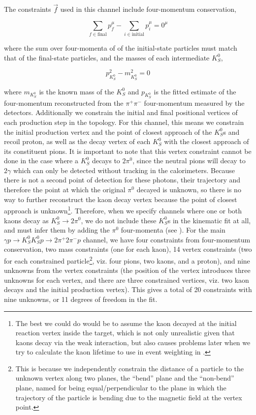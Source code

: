 The constraints $\vec{f}$ used in this channel include four-momentum conservation,

\begin{equation}
  \sum_{f\in\text{final}} p^\mu_{f} - \sum_{i\in\text{initial}} p^\mu_{i} = 0^\mu
  \label{eq:four-momentum-constraint}
\end{equation}

where the sum over four-momenta of of the initial-state particles must match that of the final-state particles, and the masses of each intermediate $K_S^0$,

\begin{equation}
  p_{K_S^0}^2 - m_{K_S^0}^2 = 0
\end{equation}

where $m_{K_S^0}$ is the known mass of the $K_S^0$ and $p_{K_S^0}$ is the fitted estimate of the four-momentum reconstructed from the $\pi^+\pi^-$ four-momentum measured by the detectors. Additionally we constrain the initial and final positional vertices of each production step in the topology. For this channel, this means we constrain the initial production vertex and the point of closest approach of the $K_S^0$s and recoil proton, as well as the decay vertex of each $K_S^0$ with the closest approach of its constituent pions. It is important to note that this vertex constraint cannot be done in the case where a $K_S^0$ decays to $2\pi^0$, since the neutral pions will decay to $2\gamma$ which can only be detected without tracking in the calorimeters. Because there is not a second point of detection for these photons, their trajectory and therefore the point at which the original $\pi^0$ decayed is unknown, so there is no way to further reconstruct the kaon decay vertex because the point of closest approach is unknown\footnote{The best we could do would be to assume the kaon decayed at the initial reaction vertex inside the target, which is not only unrealistic given that kaons decay via the weak interaction, but also causes problems later when we try to calculate the kaon lifetime to use in event weighting in .}. Therefore, when we specify channels where one or both kaons decay as $K_S^0\to 2\pi^0$, we do not include these $K_S^0$s in the kinematic fit at all, and must infer them by adding the $\pi^0$ four-momenta (see ). For the main $\gamma p \to K_S^0K_S^0p \to 2\pi^+2\pi^-p$ channel, we have four constraints from four-momentum conservation, two mass constraints (one for each kaon), 14 vertex constraints (two for each constrained particle\footnote{This is because we independently constrain the distance of a particle to the unknown vertex along two planes, the ``bend'' plane and the ``non-bend'' plane, named for being equal/perpendicular to the plane in which the trajectory of the particle is bending due to the magnetic field at the vertex point.}, viz. four pions, two kaons, and a proton), and nine unknowns from the vertex constraints (the position of the vertex introduces three unknowns for each vertex, and there are three constrained vertices, viz. two kaon decays and the initial production vertex). This gives a total of 20 constraints with nine unknowns, or 11 degrees of freedom in the fit.

